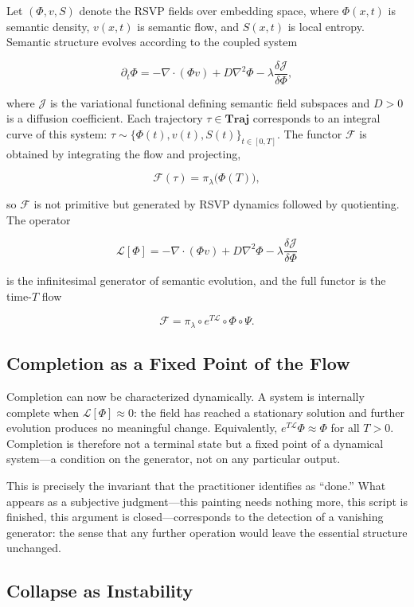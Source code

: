\documentclass[11pt, twoside]{article}
\theoremstyle{plain}
\theoremstyle{definition}
\theoremstyle{remark}
\begin{document}
Let $(\Phi, v, S)$ denote the RSVP fields over embedding space, where $\Phi(x,t)$ is semantic density, $v(x,t)$ is semantic flow, and $S(x,t)$ is local entropy. Semantic structure evolves according to the coupled system

\[
\partial_t \Phi = -\nabla \cdot (\Phi v) + D \nabla^2 \Phi - \lambda \frac{\delta \mathcal{J}}{\delta \Phi},
\]

where $\mathcal{J}$ is the variational functional defining semantic field subspaces and $D > 0$ is a diffusion coefficient. Each trajectory $\tau \in \mathbf{Traj}$ corresponds to an integral curve of this system: $\tau \sim \{\Phi(t), v(t), S(t)\}_{t \in [0,T]}$. The functor $\mathcal{F}$ is obtained by integrating the flow and projecting,

\[
\mathcal{F}(\tau) = \pi_\lambda\big(\Phi(T)\big),
\]

so $\mathcal{F}$ is not primitive but generated by RSVP dynamics followed by quotienting. The operator

\[
\mathcal{L}[\Phi] = -\nabla \cdot (\Phi v) + D \nabla^2 \Phi - \lambda \frac{\delta \mathcal{J}}{\delta \Phi}
\]

is the infinitesimal generator of semantic evolution, and the full functor is the time-$T$ flow

\[
\mathcal{F} = \pi_\lambda \circ e^{T\mathcal{L}} \circ \Phi \circ \Psi.
\]

\subsection{Completion as a Fixed Point of the Flow}

Completion can now be characterized dynamically. A system is internally complete when $\mathcal{L}[\Phi] \approx 0$: the field has reached a stationary solution and further evolution produces no meaningful change. Equivalently, $e^{T\mathcal{L}} \Phi \approx \Phi$ for all $T > 0$. Completion is therefore not a terminal state but a fixed point of a dynamical system---a condition on the generator, not on any particular output.

This is precisely the invariant that the practitioner identifies as ``done.'' What appears as a subjective judgment---this painting needs nothing more, this script is finished, this argument is closed---corresponds to the detection of a vanishing generator: the sense that any further operation would leave the essential structure unchanged.

\subsection{Collapse as Instability}
\end{document}
